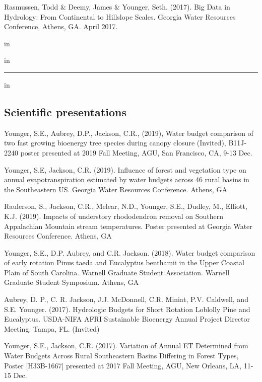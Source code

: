 \documentclass[10pt,letterpaper]{article}
\begin{document}
\begin{hangparas}{.25in}{1}
	
	Rasmussen, Todd \& Deemy, James \& Younger, Seth. (2017). Big Data in Hydrology: From Continental to Hillslope Scales. Georgia Water Resources Conference, Athens, GA. April 2017.
	
 in

\end{hangparas}

 in

\hrule
\vspace{-0.4em}
 in
\subsection*{Scientific presentations}

\begin{hangparas}{.25in}{1}
	
	Younger, S.E., Aubrey, D.P., Jackson, C.R., (2019), Water budget comparison of two fast growing bioenergy tree species during canopy closure (Invited), B11J-2240 poster presented at 2019 Fall Meeting, AGU, San Francisco, CA, 9-13 Dec.
	
	Younger, S.E, Jackson, C.R. (2019). Influence of forest and vegetation type on annual evapotranspiration estimated by water budgets across 46 rural basins in the Southeastern US. Georgia Water Resources Conference. Athens, GA
	
	Raulerson, S., Jackson, C.R., Melear, N.D., Younger, S.E., Dudley, M., Elliott, K.J. (2019). Impacts of understory rhododendron removal on Southern Appalachian Mountain stream temperatures. Poster presented at Georgia Water Resources Conference. Athens, GA
	
	Younger, S.E., D.P. Aubrey, and C.R. Jackson. (2018). Water budget comparison of early rotation Pinus taeda and Eucalyptus benthamii in the Upper Coastal Plain of South Carolina. Warnell Graduate Student Association. Warnell Graduate Student Symposium. Athens, GA
	
	Aubrey, D. P., C. R. Jackson, J.J. McDonnell, C.R. Miniat, P.V. Caldwell, and S.E. Younger. (2017). Hydrologic Budgets for Short Rotation Loblolly Pine and Eucalyptus. USDA-NIFA AFRI Sustainable Bioenergy Annual Project Director Meeting. Tampa, FL. (Invited)
	
	Younger, S.E., Jackson, C.R. (2017). Variation of Annual ET Determined from Water Budgets Across Rural Southeastern Basins Differing in Forest Types, Poster [H33B-1667] presented at 2017 Fall Meeting, AGU, New Orleans, LA, 11-15 Dec.
	

\end{hangparas}
\end{document}
